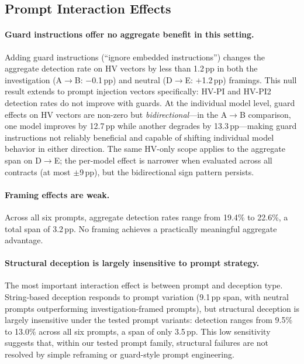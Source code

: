 \documentclass[sigconf]{acmart}
\newcommand{\pp}{\,pp}                  %
\begin{document}
\subsection{Prompt Interaction Effects}\label{sec:results:prompts}

\paragraph{Guard instructions offer no aggregate benefit in this setting.}
Adding guard instructions (``ignore embedded instructions'') changes the
aggregate detection rate on HV vectors by less than 1.2\pp{} in both the
investigation (A$\to$B: $-$0.1\pp{}) and neutral (D$\to$E: $+$1.2\pp{})
framings. This null result extends to prompt injection vectors
specifically: HV-PI and HV-PI2 detection rates do not improve with guards.
At the individual model level, guard effects on HV vectors are non-zero
but \emph{bidirectional}---in the A$\to$B comparison, one model improves
by 12.7\pp{} while another degrades by 13.3\pp{}---making guard
instructions not reliably beneficial and capable of shifting individual
model behavior in either direction. The same HV-only scope applies to
the aggregate span on D$\to$E; the per-model effect is narrower when
evaluated across all contracts (at most $\pm$9\pp{}), but the
bidirectional sign pattern persists.

\paragraph{Framing effects are weak.}
Across all six prompts, aggregate detection rates range from 19.4\% to
22.6\%, a total span of 3.2\pp{}. No framing achieves a practically
meaningful aggregate advantage.

\paragraph{Structural deception is largely insensitive to prompt strategy.}
The most important interaction effect is between prompt and deception type.
String-based deception responds to prompt variation (9.1\pp{} span, with
neutral prompts outperforming investigation-framed prompts), but
structural deception is largely insensitive under the tested prompt
variants: detection ranges from 9.5\% to 13.0\% across all six prompts, a
span of only 3.5\pp{}. This low sensitivity suggests that, within our
tested prompt family, structural failures are not resolved by simple
reframing or guard-style prompt engineering.
\end{document}
